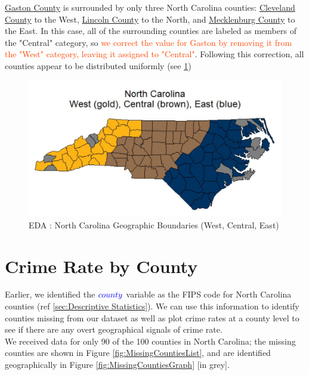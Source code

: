 \href{http://www.gastongov.com/}{Gaston County} is surrounded by only three North Carolina counties:  \href{https://www.clevelandcounty.com/main/}{Cleveland County} to the West, \href{https://www.lincolncounty.org/}{Lincoln County} to the North, and \href{https://www.mecknc.gov/Pages/Home.aspx}{Mecklenburg County} to the East.  In this case, all of the surrounding counties are labeled as members of the "Central" category, so \textcolor{OrangeRed}{we correct the value for Gaston by removing it from the "West" category, leaving it assigned to "Central"}.  Following this correction, all counties appear to be distributed uniformly (see \ref{fig:LocationCorrectedMap})\\

\begin{figure}[!ht]
	\centering
	\includegraphics[scale=0.9]{images/EDA_location_map_correct.jpg}
	\caption{EDA : North Carolina Geographic Boundaries (West, Central, East)}
	\label{fig:LocationCorrectedMap}
\end{figure}

\pagebreak

\section{Crime Rate by County}

Earlier, we identified the $\textcolor{Blue}{county}$ variable as the FIPS code for North Carolina counties (ref \ref{sec:Descriptive Statistics}).  We can use this information to identify counties missing from our dataset as well as plot crime rates at a county level to see if there are any overt geographical signals of crime rate.\\

We received data for only 90 of the 100 counties in North Carolina; the missing counties are shown in Figure \ref{fig:MissingCountiesList}, and are identified geographically in Figure \ref{fig:MissingCountiesGraph} [in grey].

